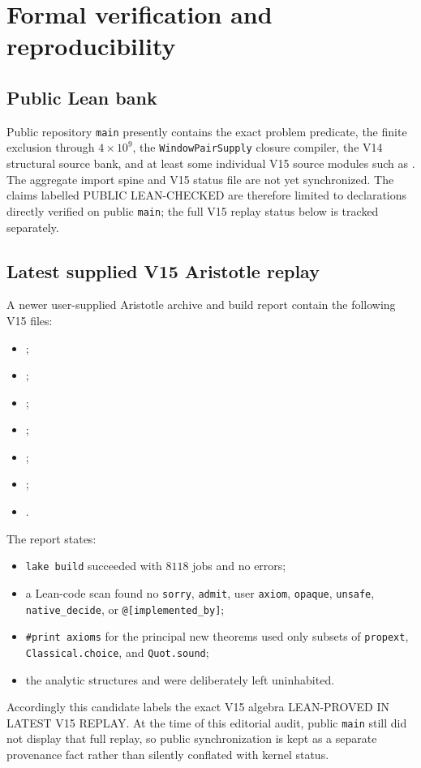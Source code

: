 \documentclass[11pt]{article}
\theoremstyle{definition}
\newcommand{\1}{\mathbf 1}
\newcommand{\status}[1]{\textsf{#1}}
\begin{document}
{{{\section{Formal verification and reproducibility}

\subsection{Public Lean bank}

Public repository \texttt{main} presently contains the exact problem predicate, the
finite exclusion through $4\times10^9$, the \texttt{WindowPairSupply} closure compiler,
the V14 structural source bank, and at least some individual V15 source modules such as
.  The aggregate  import spine and V15
status file are not yet synchronized.  The claims labelled \status{PUBLIC LEAN-CHECKED}
are therefore limited to declarations directly verified on public \texttt{main}; the full V15 replay status
below is tracked separately.

\subsection{Latest supplied V15 Aristotle replay}

A newer user-supplied Aristotle archive and build report contain the following V15 files:
\begin{itemize}[leftmargin=1.7em,itemsep=0.15em]
\item {};
\item {};
\item {};
\item {};
\item {};
\item {};
\item {}.
\end{itemize}
The report states:
\begin{itemize}[leftmargin=1.6em]
\item \texttt{lake build} succeeded with $8118$ jobs and no errors;
\item a Lean-code scan found no \texttt{sorry}, \texttt{admit}, user
  \texttt{axiom}, \texttt{opaque}, \texttt{unsafe}, \texttt{native\_decide}, or
  \texttt{@[implemented\_by]};
\item \texttt{\#print axioms} for the principal new theorems used only subsets of
  \texttt{propext}, \texttt{Classical.choice}, and \texttt{Quot.sound};
\item the analytic structures  and
   were deliberately left uninhabited.
\end{itemize}
Accordingly this candidate labels the exact V15 algebra
\status{LEAN-PROVED IN LATEST V15 REPLAY}.  At the time of this editorial audit,
public \texttt{main} still did not display that full replay, so public synchronization
is kept as a separate provenance fact rather than silently conflated with kernel status.

}}}
\end{document}
